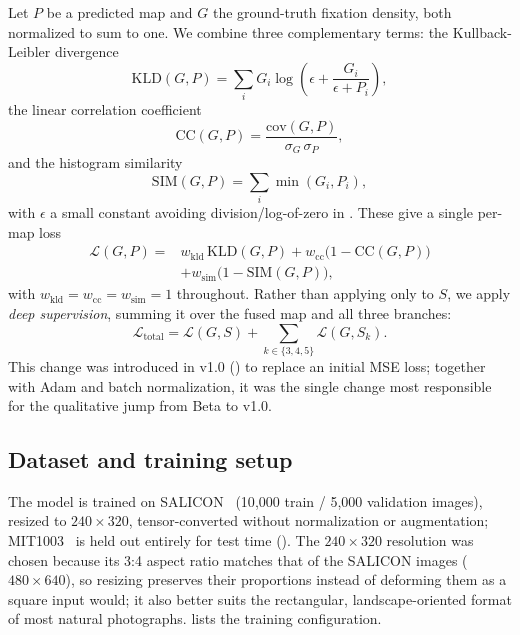 Let $P$ be a predicted map and $G$ the ground-truth fixation density, both normalized to sum to one. We combine three complementary terms: the Kullback-Leibler divergence
\begin{equation}
\label{eq:kld}
\mathrm{KLD}(G,P) = \sum_i G_i \log\left(\epsilon + \frac{G_i}{\epsilon + P_i}\right)\!,
\end{equation}
the linear correlation coefficient
\begin{equation}
\label{eq:cc}
\mathrm{CC}(G,P) = \frac{\mathrm{cov}(G,P)}{\sigma_G\,\sigma_P},
\end{equation}
and the histogram similarity
\begin{equation}
\label{eq:sim}
\mathrm{SIM}(G,P) = \sum_i \min(G_i, P_i),
\end{equation}
with $\epsilon$ a small constant avoiding division/log-of-zero in . These give a single per-map loss
\begin{equation}
\label{eq:single}
\begin{split}
\mathcal{L}(G,P) = {}& w_{\mathrm{kld}}\,\mathrm{KLD}(G,P) + w_{\mathrm{cc}}\big(1-\mathrm{CC}(G,P)\big) \\
& + w_{\mathrm{sim}}\big(1-\mathrm{SIM}(G,P)\big),
\end{split}
\end{equation}
with $w_{\mathrm{kld}} = w_{\mathrm{cc}} = w_{\mathrm{sim}} = 1$ throughout. Rather than applying  only to $S$, we apply \textit{deep supervision}, summing it over the fused map and all three branches:
\begin{equation}
\label{eq:total}
\mathcal{L}_{\mathrm{total}} = \mathcal{L}(G,S) + \sum_{k \in \{3,4,5\}} \mathcal{L}(G,S_k).
\end{equation}
This change was introduced in v1.0 () to replace an initial MSE loss; together with Adam and batch normalization, it was the single change most responsible for the qualitative jump from Beta to v1.0.

\subsection{Dataset and training setup}
\label{subsec:training11}

The model is trained on SALICON~\cite{jiang2015salicon} (10{,}000 train / 5{,}000 validation images), resized to $240\times320$, tensor-converted without normalization or augmentation; MIT1003~\cite{judd2009learning} is held out entirely for test time (). The $240\times320$ resolution was chosen because its 3:4 aspect ratio matches that of the SALICON images ($480\times640$), so resizing preserves their proportions instead of deforming them as a square input would; it also better suits the rectangular, landscape-oriented format of most natural photographs.  lists the training configuration.

